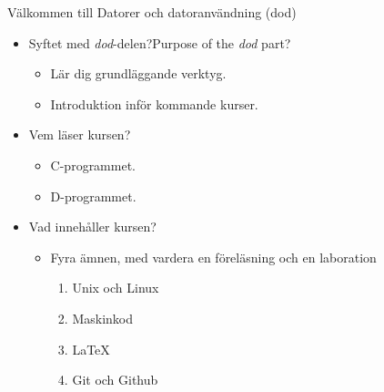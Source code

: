 




\begin{Slide}{Välkommen till Datorer och datoranvändning (dod)}
  \begin{itemize}
    \item \ifswedish Syftet med \emph{dod}-delen?\else Purpose of the \emph{dod} part?\fi
          \begin{itemize}
            \item Lär dig grundläggande verktyg.
            \item Introduktion inför kommande kurser.
          \end{itemize}
    \item Vem läser kursen?
          \begin{itemize}
            \item C-programmet.
            \item D-programmet.
          \end{itemize}
    \item Vad innehåller kursen?
          \begin{itemize}
            \item Fyra ämnen, med vardera en föreläsning och en laboration
                  \begin{enumerate}
                    \item Unix och Linux
                    \item Maskinkod
                    \item \LaTeX
                    \item Git och Github
                  \end{enumerate}
          \end{itemize}
  \end{itemize}
\end{Slide}


